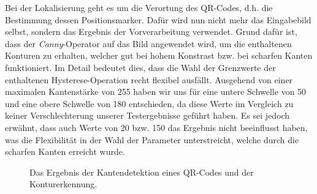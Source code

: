 \documentclass[a4paper, oneside, 12pt]{article}
\begin{document}
Bei der Lokalisierung geht es um die Verortung des QR-Codes, d.h. die Bestimmung dessen Positionsmarker. Dafür wird nun nicht mehr das Eingabebild selbst, sondern das Ergebnis der Vorverarbeitung verwendet.
Grund dafür ist, dass der \emph{Canny}-Operator \cite{canny1986computational} auf das Bild angewendet wird, um die enthaltenen Konturen zu erhalten, welcher gut bei hohem Konstrast bzw. bei scharfen Kanten funktioniert. Im Detail bedeutet dies, dass die Wahl der Grenzwerte der enthaltenen Hysterese-Operation recht flexibel ausfällt. Ausgehend von einer maximalen Kantenstärke von 255 haben wir uns für eine untere Schwelle von 50 und eine obere Schwelle von 180 entschieden, da diese Werte im Vergleich zu keiner Verschlechterung unserer Testergebnisse geführt haben. Es sei jedoch erwähnt, dass auch Werte von 20 bzw. 150 das Ergebnis nicht beeinflusst haben, was die Flexibilität in der Wahl der Parameter unterstreicht, welche durch die scharfen Kanten erreicht wurde.

\begin{figure}[h]
	\begin{center}
	\end{center}
	\caption{Das Ergebnis der Kantendetektion eines QR-Codes und der Konturerkennung.}
	\label{fig:lokalisierung}
\end{figure}
\end{document}
